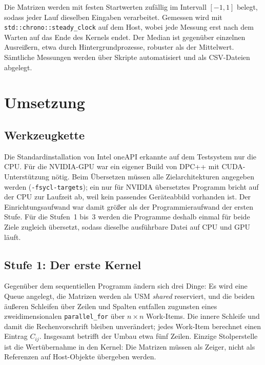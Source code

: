 \documentclass[12pt,a4paper]{article}
\begin{document}
Die Matrizen werden mit festen Startwerten zufällig im Intervall $[-1, 1]$
belegt, sodass jeder Lauf dieselben Eingaben verarbeitet. Gemessen wird mit
\texttt{std::chrono::steady\_clock} auf dem Host, wobei jede Messung erst
nach dem Warten auf das Ende des Kernels endet. Der Median ist gegenüber
einzelnen Ausreißern, etwa durch Hintergrundprozesse, robuster als der
Mittelwert. Sämtliche Messungen werden über Skripte automatisiert und als
CSV-Dateien abgelegt.

\section{Umsetzung}\label{sec:umsetzung}

\subsection{Werkzeugkette}

Die Standardinstallation von Intel oneAPI erkannte auf dem Testsystem nur die
CPU. Für die NVIDIA-GPU war ein eigener Build von DPC++ mit CUDA-Unterstützung
nötig. Beim Übersetzen müssen alle Zielarchitekturen angegeben werden
(\texttt{-fsycl-targets}); ein nur für NVIDIA übersetztes Programm bricht auf
der CPU zur Laufzeit ab, weil kein passendes Geräteabbild vorhanden ist. Der
Einrichtungsaufwand war damit größer als der Programmieraufwand der ersten
Stufe. Für die Stufen~1 bis~3 werden die Programme deshalb einmal für beide
Ziele zugleich übersetzt, sodass dieselbe ausführbare Datei auf CPU und GPU
läuft.

\subsection{Stufe 1: Der erste Kernel}

Gegenüber dem sequentiellen Programm ändern sich drei Dinge: Es wird eine
Queue angelegt, die Matrizen werden als USM \emph{shared} reserviert, und die
beiden äußeren Schleifen über Zeilen und Spalten entfallen zugunsten eines
zweidimensionalen \texttt{parallel\_for} über $n \times n$ Work-Items. Die
innere Schleife und damit die Rechenvorschrift bleiben unverändert; jedes
Work-Item berechnet einen Eintrag $C_{ij}$. Insgesamt betrifft der Umbau etwa
fünf Zeilen. Einzige Stolperstelle ist die Wertübernahme in den Kernel: Die
Matrizen müssen als Zeiger, nicht als Referenzen auf Host-Objekte übergeben
werden.
\end{document}
